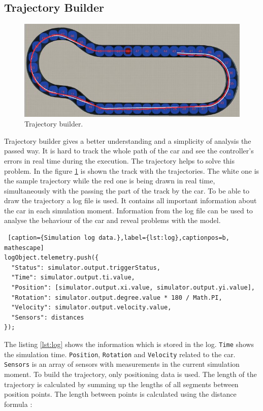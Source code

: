 \subsection{Trajectory Builder}
\begin{figure}[h!]
    \centering
    \includegraphics[width=\linewidth]{src/pic/trajectory}
    \caption{Trajectory builder.}
    \label{fig:trajectory}
\end{figure}
Trajectory builder gives a better understanding and a simplicity of analysis the passed way. It is hard to track the whole path of the car and see the controller's errors in real time during the execution. The trajectory helps to solve this problem. In the figure \ref{fig:trajectory} is shown the track with the trajectories. The white one is the sample trajectory while the red one is being drawn in real time, simultaneously with the passing the part of the track by the car. To be able to draw the trajectory a log file is used. It contains all important information about the car in each simulation moment. Information from the log file can be used to analyse the behaviour of the car and reveal problems with the model. 
\bigskip
\begin{lstlisting} [caption={Simulation log data.},label={lst:log},captionpos=b, mathescape]
logObject.telemetry.push({
  "Status": simulator.output.triggerStatus,
  "Time": simulator.output.ti.value,
  "Position": [simulator.output.xi.value, simulator.output.yi.value],
  "Rotation": simulator.output.degree.value * 180 / Math.PI,
  "Velocity": simulator.output.velocity.value,
  "Sensors": distances
});
\end{lstlisting}
\bigskip
The listing \ref{lst:log} shows the information which is stored in the log. \texttt{Time} shows the simulation time. \texttt{Position}, \texttt{Rotation} and \texttt{Velocity} related to the car. \texttt{Sensors} is an array of sensors with measurements in the current simulation moment. To build the trajectory, only positioning data is used. The length of the trajectory is calculated by summing up the lengths of all segments between position points. The length between points is calculated using the distance formula \cite{Distance}:
